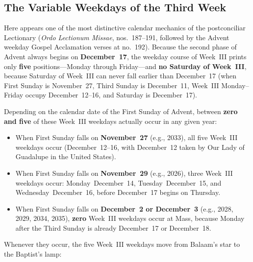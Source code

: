 \subsection{The Variable Weekdays of the Third Week}

Here appears one of the most distinctive calendar mechanics of the postconciliar Lectionary (\textit{Ordo Lectionum Missae}, nos.~187--191, followed by the Advent weekday Gospel Acclamation verses at no.~192). Because the second phase of Advent always begins on \textbf{December~17}, the weekday course of Week~III prints only \textbf{five} positions---Monday through Friday---and \textbf{no Saturday of Week~III}, because Saturday of Week~III can never fall earlier than December~17 (when First Sunday is November~27, Third Sunday is December~11, Week~III Monday--Friday occupy December~12--16, and Saturday is December~17).

Depending on the calendar date of the First Sunday of Advent, between \textbf{zero and five} of these Week~III weekdays actually occur in any given year:

\begin{itemize}
  \item When First Sunday falls on \textbf{November~27} (e.g., 2033), all five Week~III weekdays occur (December~12--16, with December~12 taken by Our Lady of Guadalupe in the United States).
  \item When First Sunday falls on \textbf{November~29} (e.g., 2026), three Week~III weekdays occur: Monday~December~14, Tuesday~December~15, and Wednesday~December~16, before December~17 begins on Thursday.
  \item When First Sunday falls on \textbf{December~2 or December~3} (e.g., 2028, 2029, 2034, 2035), \textbf{zero} Week~III weekdays occur at Mass, because Monday after the Third Sunday is already December~17 or December~18.
\end{itemize}

Whenever they occur, the five Week~III weekdays move from Balaam's star to the Baptist's lamp:

